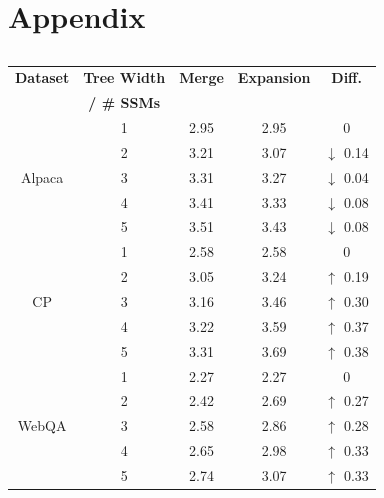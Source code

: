 \section{Appendix}

\begin{table}[h]
\begin{center}
\caption{}
\label{tab:eval_tree_construction_methods}
\begin{tabular}{cc|ccc}
\toprule
{\bf Dataset} & {\bf Tree Width} & {\bf Merge}  & {\bf Expansion} & {\bf Diff.} \\ 
 & {\bf / \# SSMs} & & & \\ \midrule
\multirow{5}{*}{Alpaca}  & 1  & 2.95     & 2.95    & 0\\
  & 2  & 3.21     & 3.07    & $\downarrow$ 0.14\\
  & 3  & 3.31     & 3.27    & $\downarrow$ 0.04\\
  & 4  & 3.41     & 3.33    & $\downarrow$ 0.08\\
  & 5  & 3.51     & 3.43    & $\downarrow$ 0.08\\
\midrule
\multirow{5}{*}{CP}  & 1  & 2.58     & 2.58    & 0\\
  & 2  & 3.05     & 3.24    & $\uparrow$ 0.19\\
  & 3  & 3.16     & 3.46    & $\uparrow$ 0.30\\
  & 4  & 3.22     & 3.59    & $\uparrow$ 0.37\\
  & 5  & 3.31     & 3.69    & $\uparrow$ 0.38\\
\midrule
\multirow{5}{*}{WebQA}  & 1  & 2.27     & 2.27    & 0\\
  & 2  & 2.42     & 2.69    & $\uparrow$ 0.27\\
  & 3  & 2.58     & 2.86    & $\uparrow$ 0.28\\
  & 4  & 2.65     & 2.98    & $\uparrow$ 0.33\\
  & 5  & 2.74     & 3.07    & $\uparrow$ 0.33\\

\end{tabular}
\end{center}
\end{table}
